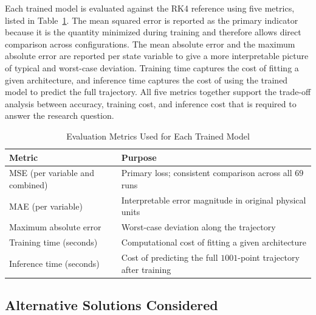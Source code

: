 Each trained model is evaluated against the RK4 reference using five metrics, listed in Table~\ref{tab:metrics}. The mean squared error is reported as the primary indicator because it is the quantity minimized during training and therefore allows direct comparison across configurations. The mean absolute error and the maximum absolute error are reported per state variable to give a more interpretable picture of typical and worst-case deviation. Training time captures the cost of fitting a given architecture, and inference time captures the cost of using the trained model to predict the full trajectory. All five metrics together support the trade-off analysis between accuracy, training cost, and inference cost that is required to answer the research question.

\begin{table}[!ht]
\centering
\caption{Evaluation Metrics Used for Each Trained Model}
\label{tab:metrics}
\renewcommand{\arraystretch}{1.2}
\begin{tabular}{|l|p{9.5cm}|}
\hline
\textbf{Metric} & \textbf{Purpose} \\
\hline
MSE (per variable and combined) & Primary loss; consistent comparison across all $69$ runs \\
\hline
MAE (per variable) & Interpretable error magnitude in original physical units \\
\hline
Maximum absolute error & Worst-case deviation along the trajectory \\
\hline
Training time (seconds) & Computational cost of fitting a given architecture \\
\hline
Inference time (seconds) & Cost of predicting the full $1001$-point trajectory after training \\
\hline
\end{tabular}
\end{table}

\subsection{Alternative Solutions Considered}

